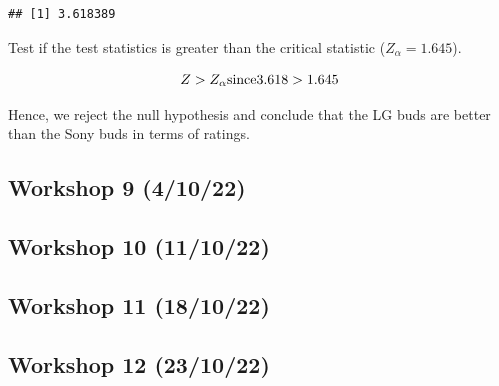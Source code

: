 \documentclass[
]{article}
\begin{document}
\begin{verbatim}
## [1] 3.618389
\end{verbatim}

Test if the test statistics is greater than the critical statistic
(\(Z_{\alpha} = 1.645\)).

\[
Z > Z_\alpha\\
\text{since}\\
3.618 > 1.645
\]

Hence, we reject the null hypothesis and conclude that the LG buds are
better than the Sony buds in terms of ratings.

\hypertarget{workshop-9-41022}{%
\subsection{Workshop 9 (4/10/22)}\label{workshop-9-41022}}

\hypertarget{workshop-10-111022}{%
\subsection{Workshop 10 (11/10/22)}\label{workshop-10-111022}}

\hypertarget{workshop-11-181022}{%
\subsection{Workshop 11 (18/10/22)}\label{workshop-11-181022}}

\hypertarget{workshop-12-231022}{%
\subsection{Workshop 12 (23/10/22)}\label{workshop-12-231022}}
\end{document}
